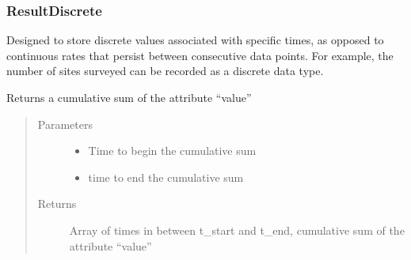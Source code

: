 \documentclass[letterpaper,10pt,english]{sphinxmanual}
\begin{document}
\subsubsection{ResultDiscrete}
\label{\detokenize{index:resultdiscrete}}

\begin{fulllineitems}
\label{\detokenize{index:feast.EmissionSimModules.result_classes.ResultDiscrete}}
Designed to store discrete values associated with specific times, as opposed to continuous rates that persist
between consecutive data points. For example, the number of sites surveyed can be recorded as a discrete data type.

\begin{fulllineitems}
\label{\detokenize{index:feast.EmissionSimModules.result_classes.ResultDiscrete.get_cumulative_vals}}
Returns a cumulative sum of the attribute “value”
\begin{quote}\begin{description}
\item[{Parameters}] \leavevmode\begin{itemize}
\item {} 
 \textendash{} Time to begin the cumulative sum

\item {} 
 \textendash{} time to end the cumulative sum

\end{itemize}

\item[{Returns}] \leavevmode
Array of times in between t\_start and t\_end, cumulative sum of the attribute “value”

\end{description}\end{quote}

\end{fulllineitems}


\end{fulllineitems}
\end{document}
